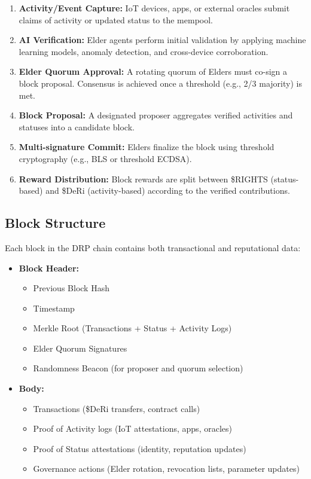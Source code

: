 \documentclass[11pt,a4paper]{article}
\begin{document}
\begin{enumerate}
    \item \textbf{Activity/Event Capture:} IoT devices, apps, or external oracles submit claims of activity or updated status to the mempool.
    \item \textbf{AI Verification:} Elder agents perform initial validation by applying machine learning models, anomaly detection, and cross-device corroboration.
    \item \textbf{Elder Quorum Approval:} A rotating quorum of Elders must co-sign a block proposal. Consensus is achieved once a threshold (e.g., 2/3 majority) is met.
    \item \textbf{Block Proposal:} A designated proposer aggregates verified activities and statuses into a candidate block.
    \item \textbf{Multi-signature Commit:} Elders finalize the block using threshold cryptography (e.g., BLS or threshold ECDSA).
    \item \textbf{Reward Distribution:} Block rewards are split between \$RIGHTS (status-based) and \$DeRi (activity-based) according to the verified contributions.
\end{enumerate}

\subsection{Block Structure}
Each block in the DRP chain contains both transactional and reputational data:

\begin{itemize}
    \item \textbf{Block Header:}
    \begin{itemize}
        \item Previous Block Hash
        \item Timestamp
        \item Merkle Root (Transactions + Status + Activity Logs)
        \item Elder Quorum Signatures
        \item Randomness Beacon (for proposer and quorum selection)
    \end{itemize}

    \item \textbf{Body:}
    \begin{itemize}
        \item Transactions (\$DeRi transfers, contract calls)
        \item Proof of Activity logs (IoT attestations, apps, oracles)
        \item Proof of Status attestations (identity, reputation updates)
        \item Governance actions (Elder rotation, revocation lists, parameter updates)
    \end{itemize}
\end{itemize}
\end{document}
